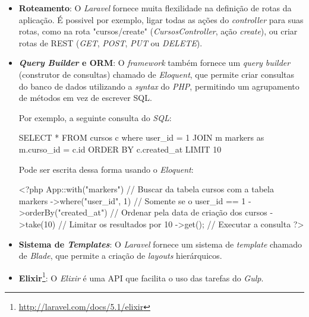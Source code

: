 \begin{itemize}
  \item \textbf{Roteamento}: O \textit{Laravel} fornece muita flexilidade na definição de rotas da aplicação. É possivel por exemplo, ligar todas as ações do \textit{controller} para suas rotas, como na rota "cursos/create" (\textit{CursosController}, ação \textit{create}), ou criar rotas de \ac{REST} (\textit{GET}, \textit{POST}, \textit{PUT} ou \textit{DELETE}).
  \item \textbf{\textit{Query Builder} e \ac{ORM}}: O \textit{framework} também fornece um \textit{query builder} (construtor de consultas) chamado de \textit{Eloquent}, que permite criar consultas do banco de dados utilizando a \textit{syntax} do \textit{PHP}, permitindo um agrupamento de métodos em vez de escrever \ac{SQL}.
  
  Por exemplo, a seguinte consulta do \textit{SQL}:
  \begin{listing}
    \begin{sqlcode}
      SELECT * FROM cursos c where user_id = 1
      JOIN m markers as m.curso_id = c.id
      ORDER BY c.created_at
      LIMIT 10
    \end{sqlcode}
    \caption{Busca simples do SQL. Buscar todos os cursos em que o user\_id seja igual a 1, unir os resultados com a tabela markers, ordenar pela data de criação do curso, e limitar os resultados por 10}
    \label{lst:sql_example_eloquent}
  \end{listing}
  \par
  Pode ser escrita dessa forma usando o \textit{Eloquent}:
  \begin{listing}
    \begin{phpcode}
      <?php
      App\Curso::with("markers") // Buscar da tabela cursos com a tabela markers
      ->where("user_id", 1) // Somente se o user_id == 1
      ->orderBy("created_at") // Ordenar pela data de criação dos cursos
      ->take(10) // Limitar os resultados por 10
      ->get(); // Executar a consulta
      ?>
    \end{phpcode}
    \caption{Consulta \ref{lst:sql_example_eloquent} em Eloquent}
    \label{lst:php_example_eloquent}
  \end{listing}
  \par
  \item \textbf{Sistema de \textit{Templates}}: O \textit{Laravel} fornece um sistema de \textit{template} chamado de \textit{Blade}, que permite a criação de \textit{layouts} hierárquicos.
  \item \textbf{Elixir}\footnote{\url{http://laravel.com/docs/5.1/elixir}}: O \textit{Elixir} é uma \ac{API} que facilita o uso das tarefas do \textit{Gulp}.
\end{itemize}

